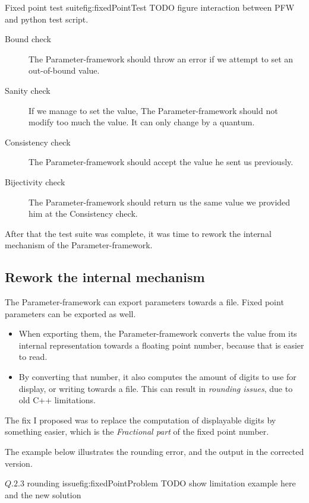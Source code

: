 \begin{figureGraphics}{Fixed point test suite}{fig:fixedPointTest}
    TODO figure interaction between PFW and python test script.
\end{figureGraphics}

\begin{description}
    \item[Bound check] The Parameter-framework should throw an error if we
        attempt to set an out-of-bound value.
    \item[Sanity check] If we manage to set the value, The Parameter-framework should not modify too much
        the value. It can only change by a quantum.
    \item[Consistency check] The Parameter-framework should accept the value he sent us previously.
    \item[Bijectivity check] The Parameter-framework should return us the same value we provided him at the Consistency check.
\end{description}

After that the test suite was complete, it was time to rework the internal
mechanism of the Parameter-framework.

\subsection{Rework the internal mechanism}
The Parameter-framework can export parameters towards a file. Fixed
point parameters can be exported as well.
\begin{itemize}
    \item When exporting them, the Parameter-framework converts the value from
        its internal representation towards a floating point number, because that is
        easier to read.
    \item By converting that number, it also computes the amount of digits
        to use for display, or writing towards a file. This can result in
        \emph{rounding issues}, due to old C++ limitations.
\end{itemize}
The fix I proposed was to replace the computation of displayable digits by something
easier, which is the \emph{Fractional part} of the fixed point number.

The example below illustrates the rounding error, and the output in the corrected version.
\begin{figureGraphics}{$Q.2.3$ rounding issue}{fig:fixedPointProblem}
    TODO show limitation example here and the new solution\\
\end{figureGraphics}



